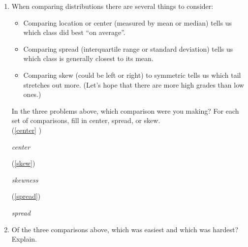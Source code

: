 \begin{enumerate}
  \item  When comparing distributions there are several things to consider:
    \begin{itemize}
    \item  Comparing location or center (measured by mean or median)
      tells us which class did best ``on average''. 
    \item  Comparing spread (interquartile range or standard
      deviation) tells us which class is generally closest to its mean.
    \item  Comparing skew (could be left or right) to symmetric tells
      us which tail stretches out more.
      (Let's hope that there are more high grades than low ones.) 
    \end{itemize}
    In the three problems above, which comparison were you making?
    For each set of comparisons, fill in center, spread, or skew. \\
    (\ref{center} )
\begin{students}
\underline{\hspace*{3cm}}\hfill 
\end{students}
\begin{key}
  \underline{\hspace*{1cm}}  {\it  center} \underline{\hspace*{1cm}}\hfill 
\end{key} 
    (\ref{skew}) 
\begin{students}
   \underline{\hspace*{3cm}}\hfill 
\end{students}
\begin{key}
  \underline{\hspace*{1cm}}  {\it  skewness} \underline{\hspace*{1cm}}\hfill 
\end{key}
    (\ref{spread}) 
\begin{students}
  \underline{\hspace*{3cm}}\hfill 
\end{students}
\begin{key}
  \underline{\hspace*{1cm}}  {\it spread} \underline{\hspace*{1cm}}\hfill 
\end{key}
  \item   Of the three comparisons above, which was easiest and which
    was hardest? Explain. 
\begin{students}
    \newpage
\end{students}


\end{enumerate}
